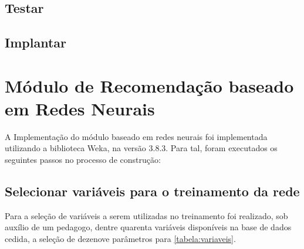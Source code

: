 \subsection{Testar}

\subsection{Implantar}

\section{Módulo de Recomendação baseado em Redes Neurais}

A Implementação do módulo baseado em redes neurais foi implementada utilizando a biblioteca Weka, na versão 3.8.3. Para tal, foram executados os seguintes passos no processo de construção:

\subsection{Selecionar variáveis para o treinamento da rede}

Para a seleção de variáveis a serem utilizadas no treinamento foi realizado, sob auxílio de um pedagogo, dentre quarenta variáveis disponíveis na base de dados cedida, a seleção de dezenove parâmetros para  \ref{tabela:variaveis}.

